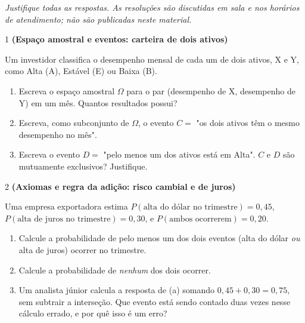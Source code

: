 \documentclass[11pt]{article}
\begin{document}

\noindent \textit{Justifique todas as respostas. As resoluções são discutidas em sala e nos horários de atendimento; não são publicadas neste material.}

\begin{questao}{1} \textbf{(Espaço amostral e eventos: carteira de dois ativos)}

Um investidor classifica o desempenho mensal de cada um de dois ativos, X e Y, como Alta (A),
Estável (E) ou Baixa (B).

\begin{enumerate}[label=(\alph*)]
  \item Escreva o espaço amostral $\Omega$ para o par (desempenho de X, desempenho de Y) em um
    mês. Quantos resultados possui?
  \item Escreva, como subconjunto de $\Omega$, o evento $C=$ "os dois ativos têm o mesmo
    desempenho no mês".
  \item Escreva o evento $D=$ "pelo menos um dos ativos está em Alta". $C$ e $D$ são mutuamente
    exclusivos? Justifique.
\end{enumerate}
\end{questao}

\begin{questao}{2} \textbf{(Axiomas e regra da adição: risco cambial e de juros)}

Uma empresa exportadora estima $P(\text{alta do dólar no trimestre})=0{,}45$,
$P(\text{alta de juros no trimestre})=0{,}30$, e $P(\text{ambos ocorrerem})=0{,}20$.

\begin{enumerate}[label=(\alph*)]
  \item Calcule a probabilidade de pelo menos um dos dois eventos (alta do dólar \emph{ou} alta de
    juros) ocorrer no trimestre.
  \item Calcule a probabilidade de \emph{nenhum} dos dois ocorrer.
  \item Um analista júnior calcula a resposta de (a) somando $0{,}45+0{,}30=0{,}75$, sem subtrair a
    interseção. Que evento está sendo contado duas vezes nesse cálculo errado, e por quê isso é um
    erro?
\end{enumerate}
\end{questao}
\end{document}
